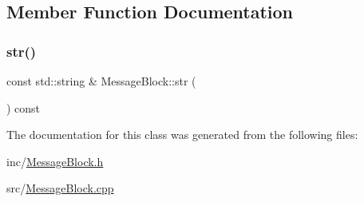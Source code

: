 \subsection{Member Function Documentation}
\mbox{\label{class_message_block_a87fc8364f0ddfd1b0b56049c4f13fc5d}} 
\subsubsection{\texorpdfstring{str()}{str()}}
{\footnotesize\ttfamily const std\+::string \& Message\+Block\+::str (\begin{DoxyParamCaption}{ }\end{DoxyParamCaption}) const}



The documentation for this class was generated from the following files\+:\begin{DoxyCompactItemize}
\item 
inc/\mbox{\hyperlink{_message_block_8h}{Message\+Block.\+h}}\item 
src/\mbox{\hyperlink{_message_block_8cpp}{Message\+Block.\+cpp}}\end{DoxyCompactItemize}
